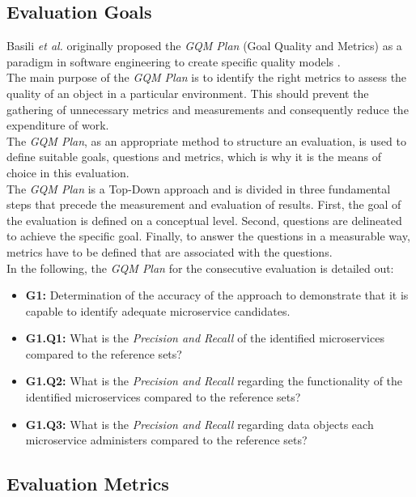 \subsection{Evaluation Goals}
\label{sec:Evaluation:GQM}
Basili \textit{et al.} originally proposed the \textit{GQM Plan} (Goal Quality and Metrics) as a paradigm in software engineering to create specific quality models \cite{BasiliGQM}. \\
The main purpose of the \textit{GQM Plan} is to identify the right metrics to assess the quality of an object in a particular environment. This should prevent the gathering of unnecessary metrics and measurements and consequently reduce the expenditure of work. \\
The \textit{GQM Plan}, as an appropriate method to structure an evaluation, is used to define suitable goals, questions and metrics, which is why it is the means of choice in this evaluation.\\
The \textit{GQM Plan} is a Top-Down approach and is divided in three fundamental steps that precede the measurement and evaluation of results. First, the goal of the evaluation is defined on a conceptual level. Second, questions are delineated to achieve the specific goal. Finally, to answer the questions in a measurable way, metrics have to be defined that are associated with the questions. \\
In the following, the \textit{GQM Plan} for the consecutive evaluation is detailed out:

\begin{itemize}
	\item \textbf{G1:} Determination of the accuracy of the approach to demonstrate that it is capable to identify adequate microservice candidates.
	\item \textbf{G1.Q1:} What is the \textit{Precision and Recall} of the identified microservices compared to the reference sets?
	\item \textbf{G1.Q2:} What is the \textit{Precision and Recall} regarding the functionality of the identified microservices compared to the reference sets?
	\item \textbf{G1.Q3:} What is the \textit{Precision and Recall} regarding data objects each microservice administers compared to the reference sets?


\end{itemize}




\subsection{Evaluation Metrics}
\label{sec:Evaluation:Metrics}

